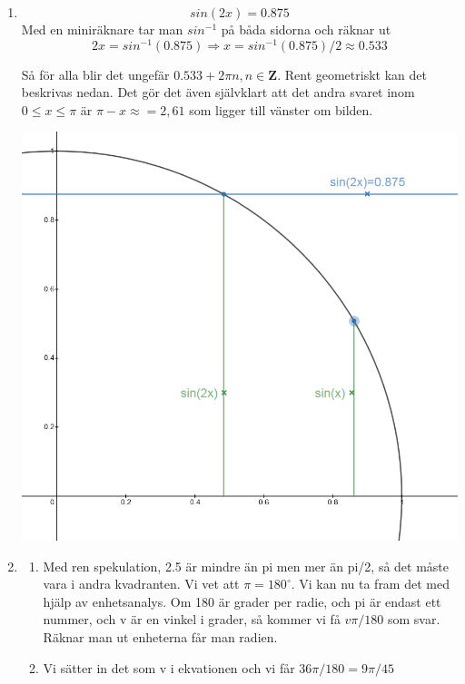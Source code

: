 \documentclass[a4paper,12pt]{article}
\begin{document}
\begin{enumerate}
    \item $$sin(2x)=0.875$$
    Med en miniräknare tar man $sin^{-1}$ på båda sidorna och räknar ut
    $$2x=sin^{-1}(0.875)\Rightarrow x=sin^{-1}(0.875)/2\approx 0.533$$

    Så för alla blir det ungefär $0.533+2\pi n, n\in \mathbf{Z}$. 
    Rent geometriskt kan det beskrivas nedan. 
    Det gör det även självklart
    att det andra svaret inom $0 \leq x \leq \pi$ är $\pi-x\approx=2,61$ som ligger till vänster om bilden.

    \includegraphics[scale=0.45]{Figur1.png}
    
    \item 
    \begin{enumerate}
        \item Med ren spekulation, 2.5 är mindre än pi men mer än pi/2, så det måste vara i andra kvadranten. 
        Vi vet att $\pi=180^\circ $. Vi kan nu ta fram det med
        hjälp av enhetsanalys. Om 180 är grader per radie, och pi är endast ett nummer, och v är en vinkel
        i grader, så kommer vi få $v\pi / 180$ som svar. Räknar man ut enheterna får man radien.
        
        \item Vi sätter in det som v i ekvationen och vi får $36\pi / 180 = 9 \pi/ 45$
    \end{enumerate}



\end{enumerate}
\end{document}
